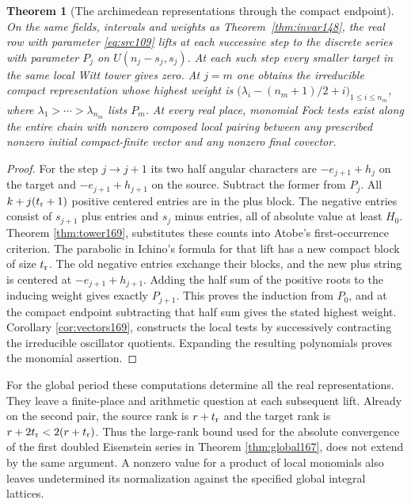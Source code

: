 \documentclass[a4paper,11pt]{article}
\newtheorem{theorem}[proposition]{Theorem}
\theoremstyle{definition}
\theoremstyle{remark}
\numberwithin{equation}{section}
\begin{document}
\begin{theorem}[The archimedean representations through the compact endpoint]
\label{thm:tower170}
On the same fields, intervals and weights as
Theorem~\ref{thm:invar148}, the real row with parameter
\eqref{eq:src109} lifts at each successive step to the
discrete series with parameter \(P_j\) on \(U(n_j-s_j,s_j)\).
At each such step every smaller target in the same local
Witt tower gives zero. At \(j=m\) one obtains the irreducible
compact representation whose highest weight is
\(\bigl(\lambda_i-(n_m+1)/2+i\bigr)_{1\le i\le n_m}\), where
\(\lambda_1>\cdots>\lambda_{n_m}\) lists \(P_m\).
At every real place, monomial Fock tests exist along the
entire chain with nonzero composed local pairing between any
prescribed nonzero initial compact-finite vector and any
nonzero final covector.
\end{theorem}
\begin{proof}
For the step \(j\to j+1\) its two half angular characters
are \(-e_{j+1}+h_j\) on the target and \(-e_{j+1}+h_{j+1}\)
on the source. Subtract the former from \(P_j\).
All \(k+j(t_{\rm r}+1)\) positive centered entries are in the
plus block. The negative entries consist of \(s_{j+1}\) plus
entries and \(s_j\) minus entries, all of absolute value
at least \(H_0\). Theorem \ref{thm:tower169}, substitutes these
counts into Atobe's first-occurrence criterion. The parabolic
in Ichino's formula for that lift has a new compact block of
size \(t_{\rm r}\). The old negative entries exchange their
blocks, and the new plus string is centered at
\(-e_{j+1}+h_{j+1}\). Adding the half sum of the positive
roots to the inducing weight gives exactly \(P_{j+1}\).
This proves the induction from \(P_0\), and at the compact
endpoint subtracting that half sum gives the stated highest
weight. Corollary \ref{cor:vectors169}, constructs the local tests
by successively contracting the irreducible oscillator
quotients. Expanding the resulting polynomials proves the
monomial assertion.
\end{proof}

For the global period these computations determine all the
real representations. They leave a finite-place and arithmetic
question at each subsequent lift. Already on the second pair,
the source rank is \(r+t_{\rm r}\) and the target rank is
\(r+2t_{\rm r}<2(r+t_{\rm r})\). Thus the large-rank bound
used for the absolute convergence of the first doubled
Eisenstein series in Theorem \ref{thm:global167}, does not extend
by the same argument. A nonzero value for a product of local
monomials also leaves undetermined its normalization against
the specified global integral lattices.
\end{document}
